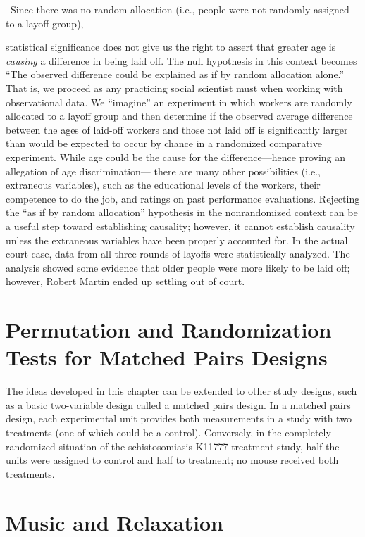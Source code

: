 \documentclass[
]{report}
\begin{document}
~Since there was no random allocation (i.e., people were not randomly assigned to a layoff group),

statistical significance does not give us the right to assert that greater age is \emph{causing} a difference in being
laid off. The null hypothesis in this context becomes ``The observed difference could be explained as if
by random allocation alone.'' That is, we proceed as any practicing social scientist must when working
with observational data. We ``imagine'' an experiment in which workers are randomly allocated to a
layoff group and then determine if the observed average difference between the ages of laid-off workers
and those not laid off is significantly larger than would be expected to occur by chance in a randomized
comparative experiment.
\textbar{} While age could be the cause for the difference---hence proving an allegation of age discrimination---
there are many other possibilities (i.e., extraneous variables), such as the educational levels of the
workers, their competence to do the job, and ratings on past performance evaluations. Rejecting the
``as if by random allocation'' hypothesis in the nonrandomized context can be a useful step toward
establishing causality; however, it cannot establish causality unless the extraneous variables have been
properly accounted for.
\textbar{} In the actual court case, data from all three rounds of layoffs were statistically analyzed. The analysis
showed some evidence that older people were more likely to be laid off; however, Robert Martin ended up
settling out of court.

\section{\texorpdfstring{\textbf{Permutation and Randomization Tests for Matched Pairs Designs}}{Permutation and Randomization Tests for Matched Pairs Designs}}\label{permutation-and-randomization-tests-for-matched-pairs-designs}

The ideas developed in this chapter can be extended to other study designs, such as a basic two-variable design
called a matched pairs design. In a matched pairs design, each experimental unit provides both measurements
in a study with two treatments (one of which could be a control). Conversely, in the completely randomized
situation of the schistosomiasis K11777 treatment study, half the units were assigned to control and half to
treatment; no mouse received both treatments.

\section*{Music and Relaxation}\label{music-and-relaxation}
\end{document}

